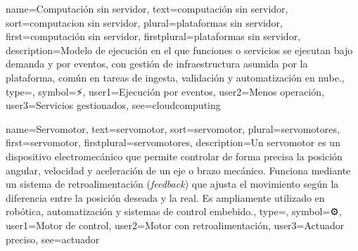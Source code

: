 	{
		name={Computaci{\'o}n sin servidor},
		text={computaci{\'o}n sin servidor},
		sort={computacion sin servidor},
		plural={plataformas sin servidor},
		first={computaci{\'o}n sin servidor},
		firstplural={plataformas sin servidor},
		description={Modelo de ejecuci{\'o}n en el que funciones o servicios se ejecutan bajo demanda y por eventos, con gesti{\'o}n de infraestructura asumida por la plataforma, com{\'u}n en tareas de ingesta, validaci{\'o}n y automatizaci{\'o}n en nube.},
		type=\glsdefaulttype,
		symbol={⚡},
		user1={Ejecuci{\'o}n por eventos},
		user2={Menos operaci{\'o}n},
		user3={Servicios gestionados},
		see={cloudcomputing}
	}
	
	{
		name={Servomotor},
		text={servomotor},
		sort={servomotor},
		plural={servomotores},
		first={servomotor},
		firstplural={servomotores},
		description={Un servomotor es un dispositivo electromec{\'a}nico que permite controlar de forma precisa la posici{\'o}n angular, velocidad y aceleraci{\'o}n de un eje o brazo mec{\'a}nico. Funciona mediante un sistema de retroalimentaci{\'o}n (\textit{feedback}) que ajusta el movimiento seg{\'u}n la diferencia entre la posici{\'o}n deseada y la real. Es ampliamente utilizado en rob{\'o}tica, automatizaci{\'o}n y sistemas de control embebido.},
		type=\glsdefaulttype,
		symbol={⚙},
		user1={Motor de control},
		user2={Motor con retroalimentaci{\'o}n},
		user3={Actuador preciso},
		see={actuador}
	}
	
	

